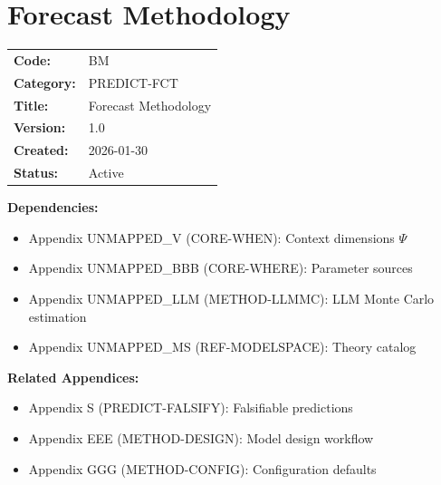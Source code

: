
\chapter{Forecast Methodology}
\label{app:forecast-methodology}

\begin{tcolorbox}[colback=blue!5!white,colframe=blue!75!black,title=Appendix Metadata]
\begin{tabular}{ll}
\textbf{Code:} & BM \\
\textbf{Category:} & PREDICT-FCT \\
\textbf{Title:} & Forecast Methodology \\
\textbf{Version:} & 1.0 \\
\textbf{Created:} & 2026-01-30 \\
\textbf{Status:} & Active \\
\end{tabular}
\end{tcolorbox}

\begin{tcolorbox}[colback=gray!5!white,colframe=gray!75!black,title=Cross-Reference Map]
\textbf{Dependencies:}
\begin{itemize}
    \item Appendix UNMAPPED_V (CORE-WHEN): Context dimensions $\Psi$
    \item Appendix UNMAPPED_BBB (CORE-WHERE): Parameter sources
    \item Appendix UNMAPPED_LLM (METHOD-LLMMC): LLM Monte Carlo estimation
    \item Appendix UNMAPPED_MS (REF-MODELSPACE): Theory catalog
\end{itemize}

\textbf{Related Appendices:}
\begin{itemize}
    \item Appendix S (PREDICT-FALSIFY): Falsifiable predictions
    \item Appendix EEE (METHOD-DESIGN): Model design workflow
    \item Appendix GGG (METHOD-CONFIG): Configuration defaults
\end{itemize}
\end{tcolorbox}

